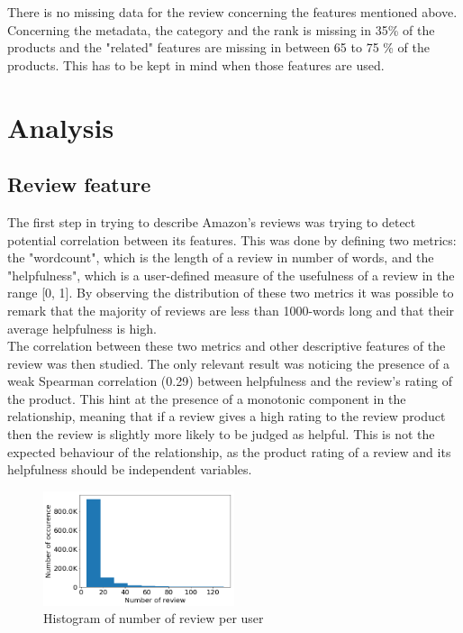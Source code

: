 \documentclass[11pt]{article}
\begin{document}
There is no missing data for the review concerning the features mentioned above.
Concerning the metadata, the category and the rank is missing in 35\% of the products and the "related" features are missing in between 65 to 75 \% of the products. This has to be kept in mind when those features are used.
\section{Analysis}
\subsection{Review feature}
    The first step in trying to describe Amazon's reviews was trying to detect potential correlation between its features. This was done by defining two metrics: the "wordcount", which is 
  the length of a review in number of words, and the "helpfulness", which is a user-defined measure of the usefulness of a review in the range [0, 1]. By observing the distribution of these two metrics it was possible to remark that the majority of reviews are less than 1000-words long and that their average helpfulness is high.\\ The correlation between these two metrics and  other descriptive features of the review was then studied. The only relevant result was noticing the presence of a weak Spearman correlation (0.29) between helpfulness and the review's rating of the product. This hint at the presence of a monotonic component in the relationship, meaning that if a review gives a high rating to the review product then the review is slightly more likely to be judged as helpful. This is not the expected behaviour of the relationship, as the product rating of a review and its helpfulness should be independent variables.
\begin{figure}[h]
\includegraphics[width=0.5\textwidth]{review_user.png}
\caption{Histogram of number of review per user}
\label{reviews_per_user}
\end{figure}
\end{document}
